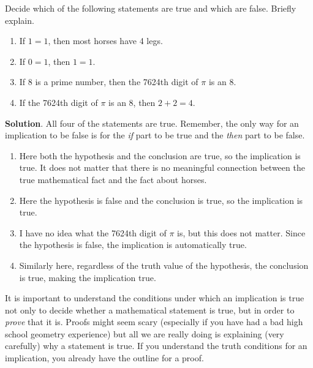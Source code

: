 \documentclass[11pt,]{book}
\theoremstyle{ptxplainnotitle}
\theoremstyle{ptxplaintitle}
\theoremstyle{ptxdefinitionnotitle}
\theoremstyle{ptxdefinitiontitle}
\theoremstyle{ptxdefinitionnotitle}
\theoremstyle{ptxdefinitiontitle}
\theoremstyle{ptxdefinitionnotitle}
\theoremstyle{ptxdefinitiontitle}
\theoremstyle{ptxdefinitiontitlenonumber}
\theoremstyle{ptxdefinitiontitlenonumber}
\numberwithin{equation}{chapter}
\begin{document}
\begin{example}\label{example-49}
\hypertarget{p-1816}{}%
Decide which of the following statements are true and which are false. Briefly explain. \leavevmode%
\begin{enumerate}
\item\hypertarget{li-773}{}\hypertarget{p-1817}{}%
If \(1=1\), then most horses have 4 legs.%
\item\hypertarget{li-774}{}\hypertarget{p-1818}{}%
If \(0=1\), then \(1=1\).%
\item\hypertarget{li-775}{}\hypertarget{p-1819}{}%
If 8 is a prime number, then the 7624th digit of \(\pi\) is an 8.%
\item\hypertarget{li-776}{}\hypertarget{p-1820}{}%
If the 7624th digit of \(\pi\) is an 8, then \(2+2 = 4\).%
\end{enumerate}
%
\par\smallskip%
\noindent\textbf{Solution}.\hypertarget{solution-231}{}\quad%
\hypertarget{p-1821}{}%
All four of the statements are true. Remember, the only way for an implication to be false is for the \emph{if} part to be true and the \emph{then} part to be false. \leavevmode%
\begin{enumerate}
\item\hypertarget{li-777}{}\hypertarget{p-1822}{}%
Here both the hypothesis and the conclusion are true, so the implication is true. It does not matter that there is no meaningful connection between the true mathematical fact and the fact about horses.%
\item\hypertarget{li-778}{}\hypertarget{p-1823}{}%
Here the hypothesis is false and the conclusion is true, so the implication is true.%
\item\hypertarget{li-779}{}\hypertarget{p-1824}{}%
I have no idea what the 7624th digit of \(\pi\) is, but this does not matter. Since the hypothesis is false, the implication is automatically true.%
\item\hypertarget{li-780}{}\hypertarget{p-1825}{}%
Similarly here, regardless of the truth value of the hypothesis, the conclusion is true, making the implication true.%
\end{enumerate}
%
\end{example}
\hypertarget{p-1826}{}%
It is important to understand the conditions under which an implication is true not only to decide whether a mathematical statement is true, but in order to \emph{prove} that it is. Proofs might seem scary (especially if you have had a bad high school geometry experience) but all we are really doing is explaining (very carefully) why a statement is true. If you understand the truth conditions for an implication, you already have the outline for a proof.%
\end{document}

